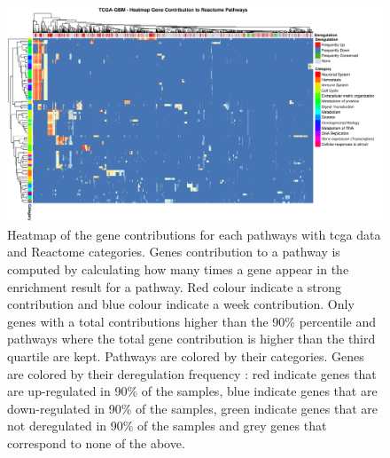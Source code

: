 \begin{figure}
    \begin{center}
        \includegraphics[width=\textwidth]{img/gene_contrib_reactome_tcga}
        \caption {
            Heatmap of the gene contributions for each pathways with \acrshort{tcga} data and Reactome categories.
            Genes contribution to a pathway is computed by calculating how many times a gene appear in the enrichment result for a pathway.
            Red colour indicate a strong contribution and blue colour indicate a week contribution.
            Only genes with a total contributions higher than the 90\% percentile and pathways where the total gene contribution is higher than the third quartile are kept.
            Pathways are colored by their categories.
            Genes are colored by their deregulation frequency : red indicate genes that are up-regulated in 90\% of the samples, blue indicate genes that are down-regulated in 90\% of the samples, green indicate genes that are not deregulated in 90\% of the samples and grey genes that correspond to none of the above.
        }
        \label{supp:gene-contrib-reactome-tcga}
    \end{center}
\end{figure}